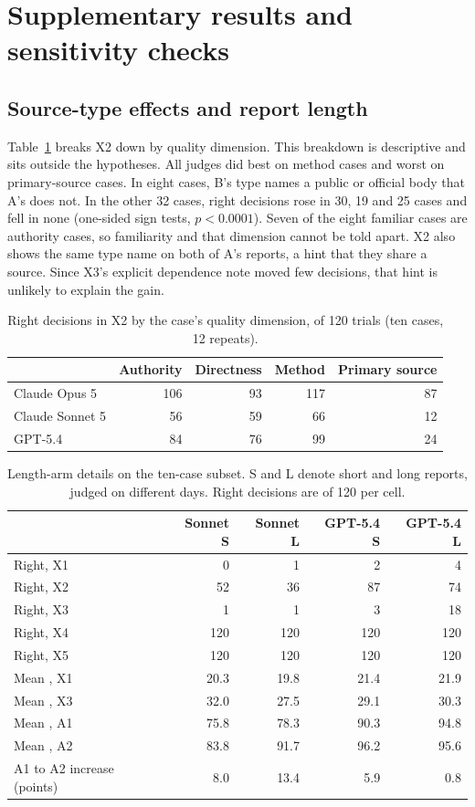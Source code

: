 \section{Supplementary results and sensitivity checks}
\label{app:supplement}
\subsection{Source-type effects and report length}
Table~\ref{tab:dimension} breaks X2 down by quality dimension. This breakdown is descriptive and
sits outside the hypotheses. All judges did best on method cases and worst on primary-source
cases. In eight cases, B's type names a public or official body that A's does not. In the other
32 cases, right decisions rose in 30, 19 and 25 cases and fell in none (one-sided sign tests,
$p<0.0001$). Seven of the eight familiar cases are authority cases, so familiarity and that
dimension cannot be told apart. X2 also shows the same type name on both of A's reports, a hint
that they share a source. Since X3's explicit dependence note moved few decisions, that hint is
unlikely to explain the gain.

\begin{table}[H]
\centering\small
\caption{Right decisions in X2 by the case's quality dimension, of 120 trials (ten cases, 12
repeats).}
\label{tab:dimension}
\begin{tabular}{@{}lrrrr@{}}
\toprule
& Authority & Directness & Method & Primary source\\
\midrule
Claude Opus 5 & 106 & 93 & 117 & 87\\
Claude Sonnet 5 & 56 & 59 & 66 & 12\\
GPT-5.4 & 84 & 76 & 99 & 24\\
\bottomrule
\end{tabular}
\end{table}
\begin{table}[H]
\centering\small
\caption{Length-arm details on the ten-case subset. S and L denote short and long reports,
judged on different days. Right decisions are of 120 per cell.}
\label{tab:length}
\begin{tabular}{@{}lrrrr@{}}
\toprule
& Sonnet S & Sonnet L & GPT-5.4 S & GPT-5.4 L\\
\midrule
Right, X1 & 0 & 1 & 2 & 4\\
Right, X2 & 52 & 36 & 87 & 74\\
Right, X3 & 1 & 1 & 3 & 18\\
Right, X4 & 120 & 120 & 120 & 120\\
Right, X5 & 120 & 120 & 120 & 120\\
\midrule
Mean \pt{}, X1 & 20.3 & 19.8 & 21.4 & 21.9\\
Mean \pt{}, X3 & 32.0 & 27.5 & 29.1 & 30.3\\
Mean \pt{}, A1 & 75.8 & 78.3 & 90.3 & 94.8\\
Mean \pt{}, A2 & 83.8 & 91.7 & 96.2 & 95.6\\
A1 to A2 increase (points) & 8.0 & 13.4 & 5.9 & 0.8\\
\bottomrule
\end{tabular}
\end{table}

